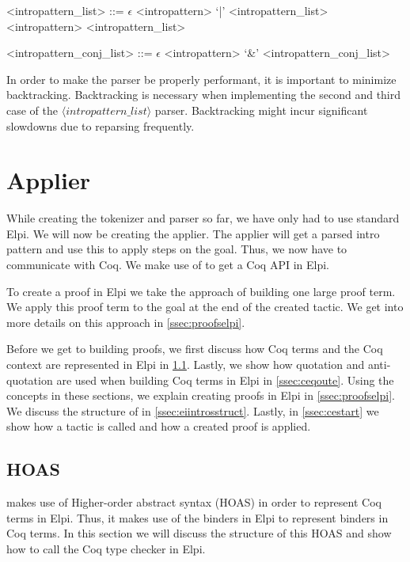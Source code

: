 \documentclass[thesis.tex]{subfiles}
\begin{document}
{{\begin{grammar}
  <intropattern\_list> ::= $\epsilon$
  \alt <intropattern> `|' <intropattern\_list>
  \alt <intropattern> <intropattern\_list>

  <intropattern\_conj\_list> ::= $\epsilon$
  \alt <intropattern> `&' <intropattern\_conj\_list>
\end{grammar}
In order to make the parser be properly performant, it is important to minimize backtracking. Backtracking is necessary when implementing the second and third case of the $\langle intropattern\_list\rangle$ parser. Backtracking might incur significant slowdowns due to reparsing frequently.

\section{Applier}\label{ssec:applier}
While creating the tokenizer and parser so far, we have only had to use standard Elpi. We will now be creating the applier. The applier will get a parsed intro pattern and use this to apply steps on the goal. Thus, we now have to communicate with Coq. We make use of \ce \cite{tassiElpiExtensionLanguage2018} to get a Coq API in Elpi.

To create a proof in Elpi we take the approach of building one large proof term. We apply this proof term to the goal at the end of the created tactic. We get into more details on this approach in \cref{ssec:proofselpi}.

Before we get to building proofs, we first discuss how Coq terms and the Coq context are represented in Elpi in \cref{ssec:cehoas}. Lastly, we show how quotation and anti-quotation are used when building Coq terms in Elpi in \cref{ssec:ceqoute}. Using the concepts in these sections, we explain creating proofs in Elpi in \cref{ssec:proofselpi}. We discuss the structure of  in \cref{ssec:eiintrosstruct}. Lastly, in \cref{ssec:cestart} we show how a tactic is called and how a created proof is applied.


\subsection{\ce HOAS} \label{ssec:cehoas}
\ce makes use of Higher-order abstract syntax (HOAS) \cite{pfenningHigherorderAbstractSyntax1988} in order to represent Coq terms in Elpi. Thus, it makes use of the binders in Elpi to represent binders in Coq terms. In this section we will discuss the structure of this HOAS and show how to call the Coq type checker in Elpi.

}}
\end{document}
